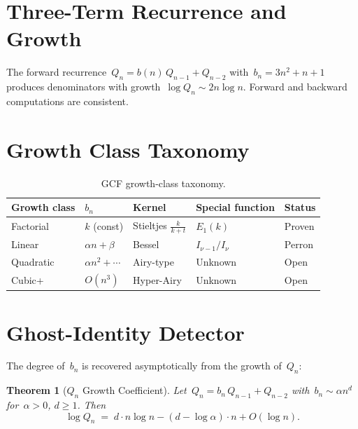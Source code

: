 \documentclass[11pt,a4paper]{article}
\newtheorem{theorem}{Theorem}
\begin{document}
\section{Three-Term Recurrence and Growth}\label{sec:recurrence}

The forward recurrence~$Q_n = b(n)\,Q_{n-1} + Q_{n-2}$ with~$b_n = 3n^2+n+1$ produces denominators with growth~$\log Q_n \sim 2n\log n$. Forward and backward computations are consistent.

\section{Growth Class Taxonomy}\label{sec:taxonomy}

\begin{table}[ht]
\centering
\caption{GCF growth-class taxonomy.}
\label{tab:taxonomy}
\begin{tabular}{@{}lllll@{}}
\toprule
Growth class & $b_n$ & Kernel & Special function & Status \\
\midrule
Factorial   & $k$ (const)         & Stieltjes $\frac{k}{k+t}$ & $E_1(k)$          & Proven \\
Linear      & $\alpha n+\beta$    & Bessel               & $I_{\nu-1}/I_\nu$ & Perron \\
Quadratic   & $\alpha n^2+\cdots$ & Airy-type            & Unknown           & Open \\
Cubic+      & $O(n^3)$            & Hyper-Airy           & Unknown           & Open \\
\bottomrule
\end{tabular}
\end{table}

\section{Ghost-Identity Detector}\label{sec:detector}

The degree of~$b_n$ is recovered asymptotically from the growth of~$Q_n$:

\begin{theorem}[$Q_n$ Growth Coefficient]\label{thm:growth}
Let~$Q_n = b_n\,Q_{n-1} + Q_{n-2}$ with~$b_n \sim \alpha n^d$ for~$\alpha > 0$, $d \geq 1$. Then
\begin{equation}\label{eq:growth}
  \log Q_n \;=\; d\cdot n\log n - (d - \log\alpha)\cdot n + O(\log n).
\end{equation}
\end{theorem}
\end{document}
